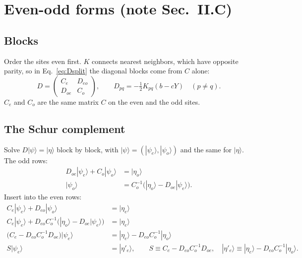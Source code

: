 \documentclass[11pt,a4paper]{article}
\numberwithin{equation}{section}
\newcommand{\Ce}{C_{e}}
\newcommand{\Co}{C_{o}}
\begin{document}
\section{Even-odd forms (note Sec.~II.C)}

\subsection{Blocks}
\label{sec:eoblocks}
Order the sites even first. $K$ connects nearest neighbors, which have opposite parity, so in
Eq.~\eqref{eq:Dsplit} the diagonal blocks come from $C$ alone:
\begin{equation}
D=\begin{pmatrix}\Ce & D_{eo}\\ D_{oe} & \Co\end{pmatrix},\qquad
D_{pq}=-\tfrac12K_{pq}(b-cY)\quad(p\neq q).
\end{equation}
$\Ce$ and $\Co$ are the same matrix $C$ on the even and the odd sites.

\subsection{The Schur complement}
\label{sec:schur}
Solve $D|\psi\rangle=|\eta\rangle$ block by block, with $|\psi\rangle=(|\psi_e\rangle,|\psi_o\rangle)$
and the same for $|\eta\rangle$. The odd rows:
\begin{align}
D_{oe}|\psi_e\rangle+\Co|\psi_o\rangle&=|\eta_o\rangle\nonumber\\
|\psi_o\rangle&=\Co^{-1}\big(|\eta_o\rangle-D_{oe}|\psi_e\rangle\big).
\label{eq:psio}
\end{align}
Insert into the even rows:
\begin{align}
\Ce|\psi_e\rangle+D_{eo}|\psi_o\rangle&=|\eta_e\rangle\nonumber\\
\Ce|\psi_e\rangle+D_{eo}\Co^{-1}\big(|\eta_o\rangle-D_{oe}|\psi_e\rangle\big)&=|\eta_e\rangle\nonumber\\
\big(\Ce-D_{eo}\Co^{-1}D_{oe}\big)|\psi_e\rangle&=|\eta_e\rangle-D_{eo}\Co^{-1}|\eta_o\rangle\nonumber\\
S|\psi_e\rangle&=|\eta'_e\rangle,\qquad S\equiv\Ce-D_{eo}\Co^{-1}D_{oe},\quad |\eta'_e\rangle\equiv|\eta_e\rangle-D_{eo}\Co^{-1}|\eta_o\rangle .
\label{eq:schur}
\end{align}
\end{document}
